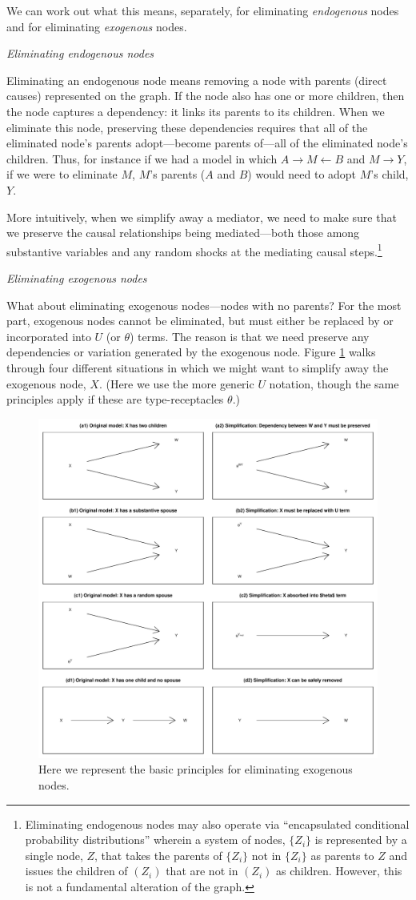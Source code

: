 \documentclass[
  12pt,
]{book}
\begin{document}
We can work out what this means, separately, for eliminating \emph{endogenous} nodes and for eliminating \emph{exogenous} nodes.

\emph{Eliminating endogenous nodes}

Eliminating an endogenous node means removing a node with parents (direct causes) represented on the graph. If the node also has one or more children, then the node captures a dependency: it links its parents to its children. When we eliminate this node, preserving these dependencies requires that all of the eliminated node's parents adopt---become parents of---all of the eliminated node's children. Thus, for instance if we had a model in which \(A \rightarrow M \leftarrow B\) and \(M \rightarrow Y\), if we were to eliminate \(M\), \(M\)'s parents (\(A\) and \(B\)) would need to adopt \(M\)'s child, \(Y\).

More intuitively, when we simplify away a mediator, we need to make sure that we preserve the causal relationships being mediated---both those among substantive variables and any random shocks at the mediating causal steps.\footnote{Eliminating endogenous nodes may also operate via ``encapsulated conditional probability distributions'' \citep{koller2009probabilistic} wherein a system of nodes, \(\{Z_i\}\) is represented by a single node, \(Z\), that takes the parents of \(\{Z_i\}\) not in \(\{Z_i\}\) as parents to \(Z\) and issues the children of \((Z_i)\) that are not in \((Z_i)\) as children. However, this is not a fundamental alteration of the graph.}

\emph{Eliminating exogenous nodes}

What about eliminating exogenous nodes---nodes with no parents? For the most part, exogenous nodes cannot be eliminated, but must either be replaced by or incorporated into \(U\) (or \(\theta\)) terms. The reason is that we need preserve any dependencies or variation generated by the exogenous node. Figure \ref{fig:elimrules} walks through four different situations in which we might want to simplify away the exogenous node, \(X\). (Here we use the more generic \(U\) notation, though the same principles apply if these are type-receptacles \(\theta\).)

\begin{figure}

{\centering \includegraphics[width=.5\textwidth]{ii_files/figure-latex/elimrules-1} 

}

\caption{Here we represent the basic principles for eliminating exogenous nodes.}\label{fig:elimrules}
\end{figure}
\end{document}
